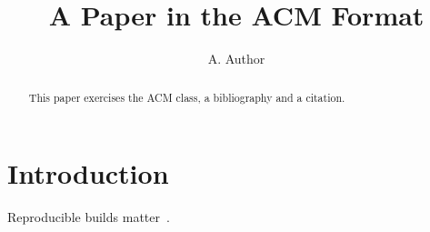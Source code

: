 \documentclass[sigconf,nonacm]{acmart}
\begin{document}
\title{A Paper in the ACM Format}

\author{A. Author}

\begin{abstract}
  This paper exercises the ACM class, a bibliography and a citation.
\end{abstract}

\maketitle

\section{Introduction}

Reproducible builds matter~\cite{reproducible}.



\end{document}
